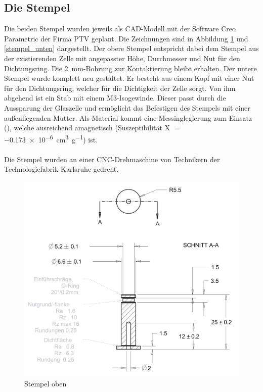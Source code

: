 \documentclass[a4paper, 11pt, headsepline,footsepline,twoside,abstract]{scrbook}
\begin{document}
\subsection{Die Stempel}
Die beiden Stempel wurden jeweils als CAD-Modell mit der Software Creo Parametric der Firma PTV geplant. Die Zeichnungen sind in Abbildung \ref{stempel_oben} und \ref{stempel_unten} dargestellt. Der obere Stempel entspricht dabei dem Stempel aus der existierenden Zelle mit angepasster Höhe, Durchmesser und Nut für den Dichtungsring. Die \SI{2}{\milli\metre}-Bohrung zur Kontaktierung bleibt erhalten. Der untere Stempel wurde komplett neu gestaltet. Er besteht aus einem Kopf mit einer Nut für den Dichtungsring, welcher für die Dichtigkeit der Zelle sorgt. Von ihm abgehend ist ein Stab mit einem M3-Isogewinde. Dieser passt durch die Aussparung der Glaszelle und ermöglicht das Befestigen des Stempels mit einer außenliegenden Mutter. Als Material kommt eine Messinglegierung zum Einsatz (), welche ausreichend amagnetisch (Suszeptibilität X $=\;$\SI{-0.173e-6}{\cubic\centi\metre\per\gram}) ist. 
\\\\
Die Stempel wurden an einer CNC-Drehmaschine von Technikern der Technologiefabrik Karlsruhe gedreht. %
\begin{figure}
	\centering
	\includegraphics[width=0.7\columnwidth]{images/stempel_oben.png}
	\caption{Stempel oben}
	\label{stempel_oben}
\end{figure}
\end{document}
